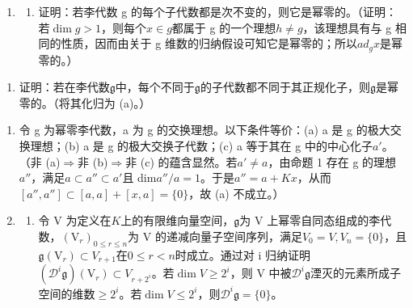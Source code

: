 \begin{enumerate}
\def\labelenumi{\arabic{enumi}.}
\setcounter{enumi}{4}
\tightlist
\item
  \begin{enumerate}
  \def\labelenumii{(\alph{enumii})}
  \tightlist
  \item
    证明：若李代数 g 的每个子代数都是次不变的，则它是幂零的。（证明：若\(\dim g > 1\)，则每个\(x \in g\)都属于 g 的一个理想\(h \neq g\)，该理想具有与 g 相同的性质，因而由关于 g 维数的归纳假设可知它是幂零的；所以\(ad_{g} x\)是幂零的。）
  \end{enumerate}
\end{enumerate}

\begin{enumerate}
\def\labelenumi{(\alph{enumi})}
\setcounter{enumi}{1}
\tightlist
\item
  证明：若在李代数\(\mathfrak{g}\)中，每个不同于\(\mathfrak{g}\)的子代数都不同于其正规化子，则\(\mathfrak{g}\)是幂零的。（将其化归为 (a)。）
\end{enumerate}

\begin{enumerate}
\def\labelenumi{\arabic{enumi}.}
\setcounter{enumi}{5}
\item
  令 g 为幂零李代数，a 为 g 的交换理想。以下条件等价：(a) a 是 g 的极大交换理想；(b) a 是 g 的极大交换子代数；(c) a 等于其在 g 中的中心化子\(a'\)。（非 (a)\(\Rightarrow\)非 (b)\(\Rightarrow\)非 (c) 的蕴含显然。若\(a' \neq a\)，由命题 1 存在 g 的理想\(a''\)，满足\(a \subset a'' \subset a'\)且 dim\(a''/a = 1\)。于是\(a'' = a + Kx\)，从而\([a'', a''] \subset [a, a] + [x, a] = \{0\}\)，故 (a) 不成立。）
\item
  \begin{enumerate}
  \def\labelenumii{(\alph{enumii})}
  \tightlist
  \item
    令 V 为定义在\(K\)上的有限维向量空间，\(\mathfrak{g}\)为 V 上幂零自同态组成的李代数，\((\mathrm{V}_{r})_{0 \leq r \leq n}\)为 V 的递减向量子空间序列，满足\(V_{0} = V, V_{n} = \{0\}\)，且\(\mathfrak{g}(\mathrm{V}_{r}) \subset V_{r+1}\)在\(0 \leq r < n\)时成立。通过对 i 归纳证明\((\mathcal{D}^{i}\mathfrak{g})(\mathrm{V}_{r}) \subset V_{r+2^{i}}\)。若\(\dim V \geq 2^{i}\)，则 V 中被\(\mathcal{D}^{i}\mathfrak{g}\)湮灭的元素所成子空间的维数\(\geqslant 2^{i}\)。若\(\dim V \leqslant 2^{i}\)，则\(\mathcal{D}^{i}\mathfrak{g} = \{0\}\)。
  \end{enumerate}
\end{enumerate}

